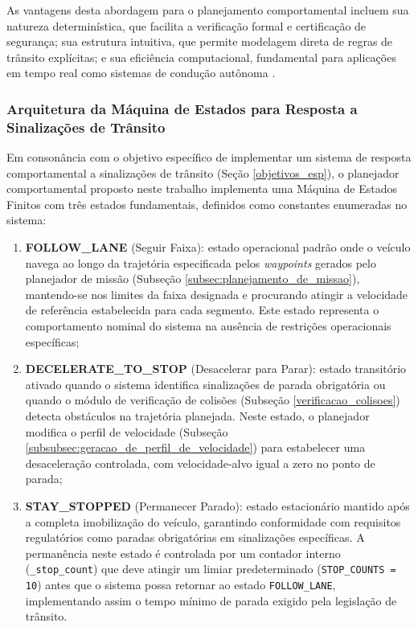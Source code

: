 As vantagens desta abordagem para o planejamento comportamental incluem sua natureza determinística, que facilita a verificação formal e certificação de segurança; sua estrutura intuitiva, que permite modelagem direta de regras de trânsito explícitas; e sua eficiência computacional, fundamental para aplicações em tempo real como sistemas de condução autônoma \cite{wei2014behavioral}.

\subsubsection{Arquitetura da Máquina de Estados para Resposta a Sinalizações de Trânsito}

Em consonância com o objetivo específico de implementar um sistema de resposta comportamental a sinalizações de trânsito (Seção \ref{objetivos_esp}), o planejador comportamental proposto neste trabalho implementa uma Máquina de Estados Finitos com três estados fundamentais, definidos como constantes enumeradas no sistema:

\begin{enumerate}
    \item \textbf{FOLLOW\_LANE} (Seguir Faixa): estado operacional padrão onde o veículo navega ao longo da trajetória especificada pelos \textit{waypoints} gerados pelo planejador de missão (Subseção \ref{subsec:planejamento_de_missao}), mantendo-se nos limites da faixa designada e procurando atingir a velocidade de referência estabelecida para cada segmento. Este estado representa o comportamento nominal do sistema na ausência de restrições operacionais específicas;
    
    \item \textbf{DECELERATE\_TO\_STOP} (Desacelerar para Parar): estado transitório ativado quando o sistema identifica sinalizações de parada obrigatória ou quando o módulo de verificação de colisões (Subseção \ref{verificacao_colisoes}) detecta obstáculos na trajetória planejada. Neste estado, o planejador modifica o perfil de velocidade (Subseção \ref{subsubsec:geracao_de_perfil_de_velocidade}) para estabelecer uma desaceleração controlada, com velocidade-alvo igual a zero no ponto de parada;
    
    \item \textbf{STAY\_STOPPED} (Permanecer Parado): estado estacionário mantido após a completa imobilização do veículo, garantindo conformidade com requisitos regulatórios como paradas obrigatórias em sinalizações específicas. A permanência neste estado é controlada por um contador interno (\texttt{\_stop\_count}) que deve atingir um limiar predeterminado (\texttt{STOP\_COUNTS = 10}) antes que o sistema possa retornar ao estado \texttt{FOLLOW\_LANE}, implementando assim o tempo mínimo de parada exigido pela legislação de trânsito.
\end{enumerate}

